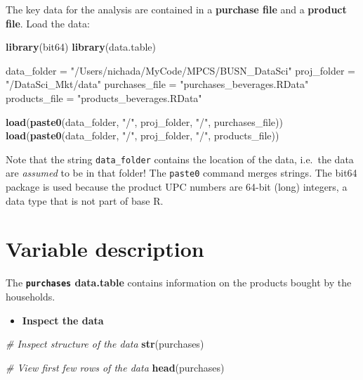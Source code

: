 \documentclass[
]{article}
\newenvironment{Shaded}{\begin{snugshade}}{\end{snugshade}}
\newcommand{\CommentTok}[1]{\textcolor[rgb]{0.56,0.35,0.01}{\textit{#1}}}
\newcommand{\FunctionTok}[1]{\textcolor[rgb]{0.13,0.29,0.53}{\textbf{#1}}}
\newcommand{\NormalTok}[1]{#1}
\newcommand{\OtherTok}[1]{\textcolor[rgb]{0.56,0.35,0.01}{#1}}
\newcommand{\StringTok}[1]{\textcolor[rgb]{0.31,0.60,0.02}{#1}}
\providecommand{\tightlist}{%
  \setlength{\itemsep}{0pt}\setlength{\parskip}{0pt}}
\begin{document}
The key data for the analysis are contained in a \textbf{purchase file}
and a \textbf{product file}. Load the data:

\begin{Shaded}
\begin{Highlighting}[]
\FunctionTok{library}\NormalTok{(bit64)}
\FunctionTok{library}\NormalTok{(data.table)}

\NormalTok{data\_folder    }\OtherTok{=} \StringTok{"/Users/nichada/MyCode/MPCS/BUSN\_DataSci"}
\NormalTok{proj\_folder }\OtherTok{=} \StringTok{"/DataSci\_Mkt/data"}
\NormalTok{purchases\_file }\OtherTok{=} \StringTok{"purchases\_beverages.RData"}
\NormalTok{products\_file  }\OtherTok{=} \StringTok{"products\_beverages.RData"}

\FunctionTok{load}\NormalTok{(}\FunctionTok{paste0}\NormalTok{(data\_folder, }\StringTok{"/"}\NormalTok{, proj\_folder, }\StringTok{"/"}\NormalTok{, purchases\_file))}
\FunctionTok{load}\NormalTok{(}\FunctionTok{paste0}\NormalTok{(data\_folder, }\StringTok{"/"}\NormalTok{, proj\_folder, }\StringTok{"/"}\NormalTok{, products\_file))}
\end{Highlighting}
\end{Shaded}

Note that the string \texttt{data\_folder} contains the location of the
data, i.e.~the data are \emph{assumed} to be in that folder! The
\texttt{paste0} command merges strings. The bit64 package is used
because the product UPC numbers are 64-bit (long) integers, a data type
that is not part of base R.

\newpage

\section{Variable description}\label{variable-description}

The \textbf{\texttt{purchases} data.table} contains information on the
products bought by the households.

\begin{itemize}
\tightlist
\item
  \textbf{Inspect the data}
\end{itemize}

\begin{Shaded}
\begin{Highlighting}[]
\CommentTok{\# Inspect structure of the data}
\FunctionTok{str}\NormalTok{(purchases)}

\CommentTok{\# View first few rows of the data}
\FunctionTok{head}\NormalTok{(purchases)}
\end{Highlighting}
\end{Shaded}
\end{document}
